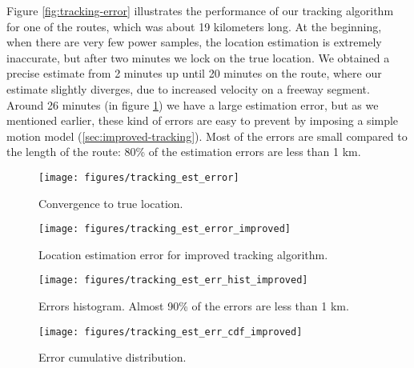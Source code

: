 Figure \ref{fig:tracking-error} illustrates the performance of our tracking algorithm for
one of the routes, which was about 19 kilometers long.
At the beginning, when there are very few power samples, the location estimation is extremely inaccurate,
but after two minutes we lock on the true location.
We obtained a precise estimate from 2 minutes up until 20 minutes on the route,
where our estimate slightly diverges, due to increased velocity on a freeway segment.
Around 26 minutes (in figure \ref{fig:est-error}) we have a large estimation error,
but as we mentioned earlier, these kind of errors are easy to prevent by imposing a simple motion model
(\cref{sec:improved-tracking}).
Most of the errors are small compared to the length of the route: 80\% of the estimation errors are less than 1 km.

\begin{figure*}
  \centering
  \begin{subfigure}{0.4\textwidth}
    \texttt{[image: figures/tracking\_est\_error]}
    \caption{Convergence to true location.}
    \label{fig:est-error}
  \end{subfigure}
  \hspace{2cm}
  \begin{subfigure}{0.4\textwidth}
      \texttt{[image: figures/tracking\_est\_error\_improved]}
      \caption{Location estimation error for improved tracking algorithm.}
      \label{fig:tracking-error-improved}
  \end{subfigure}

  \caption{Location estimation error for online tracking.}
  \label{fig:tracking-error}
\end{figure*}

\begin{figure*}
    \centering

    \begin{subfigure}{0.4\textwidth}
      \texttt{[image: figures/tracking\_est\_err\_hist\_improved]}
      \caption{Errors histogram. Almost 90\% of the errors are less than 1 km.}
    \end{subfigure}
    \hspace{2cm}
    \begin{subfigure}{0.4\textwidth}
      \texttt{[image: figures/tracking\_est\_err\_cdf\_improved]}
      \caption{Error cumulative distribution.}
    \end{subfigure}

    \caption{Estimation errors distribution for motion-model tracking.}
    \label{fig:error-distribution}
\end{figure*}

